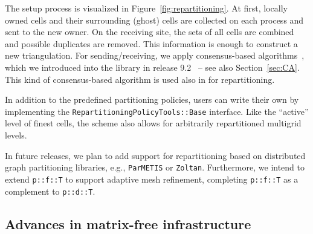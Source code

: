 \documentclass{ansarticle-preprint}
\begin{document}
The setup process is visualized in Figure~\ref{fig:repartitioning}. At
first, locally owned cells and their
surrounding (ghost) cells are collected on each process and
sent to the new owner. On the
receiving site, the sets of all cells are combined and possible duplicates
are removed. This information is enough to construct a new triangulation.
For sending/receiving, we apply consensus-based algorithms~\cite{hoefler2010scalable}, which
we introduced into the library in release 9.2~\cite{dealII92} -- see
also Section~\ref{sec:CA}. This kind of consensus-based
algorithm is used also in \cite{ibanez2016pumi} for repartitioning.

In addition to the predefined partitioning policies, users
can write their own by implementing the
\texttt{RepartitioningPolicyTools::Base} interface. Like the
``active'' level of finest cells, the scheme also allows for
arbitrarily repartitioned multigrid levels.

In future releases, we plan to add support for repartitioning based on distributed graph
partitioning libraries, e.g., \texttt{ParMETIS} or \texttt{Zoltan}. Furthermore, we intend to extend
\texttt{p::f::T} to support adaptive mesh refinement, completing \texttt{p::f::T}
as a complement to \texttt{p::d::T}.



\subsection{Advances in matrix-free infrastructure}\label{sec:mf}
\end{document}

